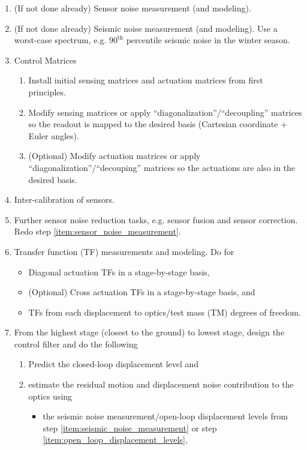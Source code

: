 \begin{enumerate}
	\item (If not done already) Sensor noise measurement (and modeling).  \label{item:sensor_noise_measurement}
	\item (If not done already) Seismic noise measurement (and modeling). Use a worst-case spectrum, e.g. $90^\mathrm{th}$ percentile seismic noise in the winter season. \label{item:seismic_noise_measurement}
	\item Control Matrices
	\begin{enumerate}
		\item Install initial sensing matrices and actuation matrices from first principles.
		\item Modify sensing matrices or apply ``diagonalization''/``decoupling'' matrices so the readout is mapped to the desired basis (Cartesian coordinate + Euler angles).
		\item (Optional) Modify actuation matrices or apply ``diagonalization''/``decouping'' matrices so the actuations are also in the desired basis.
	\end{enumerate}
	\item Inter-calibration of sensors.
	\item Further sensor noise reduction tasks, e.g. sensor fusion and sensor correction. Redo step \ref{item:sensor_noise_measurement}.
	\item Transfer function (TF) measurements and modeling. Do for
	\begin{itemize}
		\item Diagonal actuation TFs in a stage-by-stage basis, \label{item:diagonal_tf}
		\item (Optional) Cross actuation TFs in a stage-by-stage basis, and \label{item:cross_tf}
		\item TFs from each displacement to optics/test mass (TM) degrees of freedom. \label{item:displacement_to_optics_tf}
	\end{itemize}
	\item From the highest stage (closest to the ground) to lowest stage, design the control filter and do the following \label{item:design_control_filter}
	\begin{enumerate}
		\item Predict the closed-loop displacement level and
		\item estimate the residual motion and displacement noise contribution to the optics using
		\begin{itemize}
			\item the seismic noise measurement/open-loop displacement levels from step \ref{item:seismic_noise_measurement} or step \ref{item:open_loop_displacement_levels},

\end{itemize}
\end{enumerate}
\end{enumerate}
